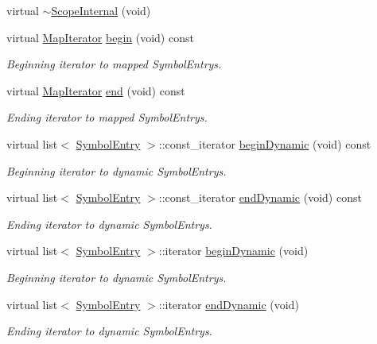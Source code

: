 \begin{DoxyCompactItemize}
virtual \mbox{\hyperlink{class_scope_internal_a176aa80371fedd10ec46d43667a44420}{$\sim$\+Scope\+Internal}} (void)
\item 
virtual \mbox{\hyperlink{class_map_iterator}{Map\+Iterator}} \mbox{\hyperlink{class_scope_internal_ace6700a82166765cf943bb95f1efeb10}{begin}} (void) const
\begin{DoxyCompactList}\small\item\em Beginning iterator to mapped Symbol\+Entrys. \end{DoxyCompactList}\item 
virtual \mbox{\hyperlink{class_map_iterator}{Map\+Iterator}} \mbox{\hyperlink{class_scope_internal_a47df37673b1cea67ac1b4980037eafe0}{end}} (void) const
\begin{DoxyCompactList}\small\item\em Ending iterator to mapped Symbol\+Entrys. \end{DoxyCompactList}\item 
virtual list$<$ \mbox{\hyperlink{class_symbol_entry}{Symbol\+Entry}} $>$\+::const\+\_\+iterator \mbox{\hyperlink{class_scope_internal_a3e1111265c90754ecafd2331f9c7a684}{begin\+Dynamic}} (void) const
\begin{DoxyCompactList}\small\item\em Beginning iterator to dynamic Symbol\+Entrys. \end{DoxyCompactList}\item 
virtual list$<$ \mbox{\hyperlink{class_symbol_entry}{Symbol\+Entry}} $>$\+::const\+\_\+iterator \mbox{\hyperlink{class_scope_internal_ad1690a1aacfecff51b6d5832cccafd95}{end\+Dynamic}} (void) const
\begin{DoxyCompactList}\small\item\em Ending iterator to dynamic Symbol\+Entrys. \end{DoxyCompactList}\item 
virtual list$<$ \mbox{\hyperlink{class_symbol_entry}{Symbol\+Entry}} $>$\+::iterator \mbox{\hyperlink{class_scope_internal_afc5849bd91bd3eb1aa65900888317f98}{begin\+Dynamic}} (void)
\begin{DoxyCompactList}\small\item\em Beginning iterator to dynamic Symbol\+Entrys. \end{DoxyCompactList}\item 
virtual list$<$ \mbox{\hyperlink{class_symbol_entry}{Symbol\+Entry}} $>$\+::iterator \mbox{\hyperlink{class_scope_internal_a705f7003cbadcddbb621b951573c61e7}{end\+Dynamic}} (void)
\begin{DoxyCompactList}\small\item\em Ending iterator to dynamic Symbol\+Entrys. \end{DoxyCompactList}\item 

\end{DoxyCompactItemize}
